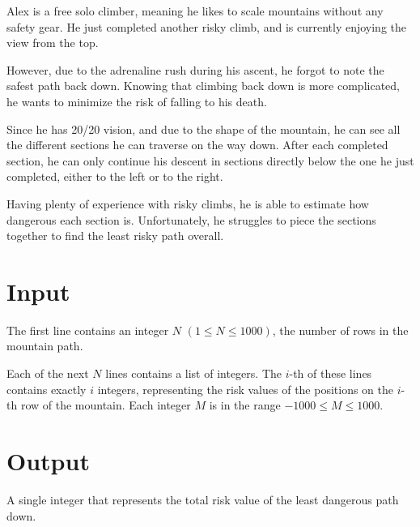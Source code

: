 
Alex is a free solo climber, meaning he likes to scale mountains without any safety gear.
He just completed another risky climb, and is currently enjoying the view from the top.

However, due to the adrenaline rush during his ascent, he forgot to note the safest path back down.
Knowing that climbing back down is more complicated, he wants to minimize the risk of falling to his death.

Since he has 20/20 vision, and due to the shape of the mountain, he can see all the different sections
he can traverse on the way down. After each completed section, he can only continue his descent in sections
directly below the one he just completed, either to the left or to the right.

Having plenty of experience with risky climbs, he is able to estimate how dangerous each
section is. Unfortunately, he struggles to piece the sections together to find the least
risky path overall.


\section*{Input}

The first line contains an integer $N$ $(1 \leq N \leq 1000)$, the number of rows in the mountain path.

Each of the next $N$ lines contains a list of integers. The $i$-th of these lines contains exactly $i$ integers, representing the risk values of the positions on the $i$-th row of the mountain. Each integer $M$ is in the range $-1000 \leq M \leq 1000$.

\section*{Output}

A single integer that represents the total risk value of the least dangerous path down.